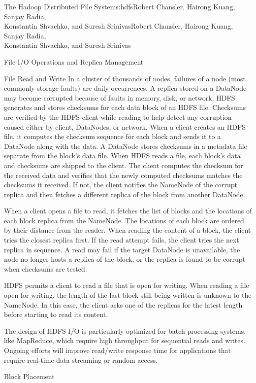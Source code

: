 \begin{aosachaptertoc}{The Hadoop Distributed File System}{s:hdfs}{Robert Chansler, Hairong Kuang, Sanjay Radia, \\ Konstantin Shvachko, and Suresh Srinivas}{Robert Chansler, Hairong Kuang, Sanjay Radia, \\ \hspace*{0.9cm} Konstantin Shvachko, and Suresh Srinivas}
\begin{aosasect1}{File I/O Operations and Replica Management}
\begin{aosasect2}{File Read and Write}
In a cluster of thousands of nodes, failures of a node (most commonly
storage faults) are daily occurrences. A replica stored on a DataNode
may become corrupted because of faults in memory, disk, or network.
HDFS generates and stores checksums for each data block of an HDFS
file. Checksums are verified by the HDFS client while reading to help
detect any corruption caused either by client, DataNodes, or
network. When a client creates an HDFS file, it computes the checksum
sequence for each block and sends it to a DataNode along with the
data. A DataNode stores checksums in a metadata file separate from the
block's data file. When HDFS reads a file, each block's data and
checksums are shipped to the client. The client computes the checksum
for the received data and verifies that the newly computed checksums
matches the checksums it received. If not, the client notifies the
NameNode of the corrupt replica and then fetches a different replica
of the block from another DataNode.

When a client opens a file to read, it fetches the list of blocks and
the locations of each block replica from the NameNode. The locations
of each block are ordered by their distance from the reader. When
reading the content of a block, the client tries the closest replica
first. If the read attempt fails, the client tries the next replica in
sequence. A read may fail if the target DataNode is unavailable, the
node no longer hosts a replica of the block, or the replica is found
to be corrupt when checksums are tested.

HDFS permits a client to read a file that is open for writing. When
reading a file open for writing, the length of the last block still
being written is unknown to the NameNode. In this case, the client
asks one of the replicas for the latest length before starting to read
its content.

The design of HDFS I/O is particularly optimized for batch processing
systems, like MapReduce, which require high throughput for sequential
reads and writes. Ongoing efforts will improve read/write response
time for applications that require real-time data streaming or random
access.

\end{aosasect2}

\begin{aosasect2}{Block Placement}


\end{aosasect2}
\end{aosasect1}
\end{aosachaptertoc}
